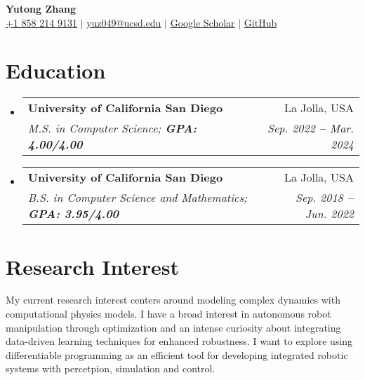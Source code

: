 \documentclass[letterpaper,11pt]{article}
\makeatletter
\newcommand{\resumeEducationHeading}[4]{
    \vspace{-2pt}\item
    \begin{tabular*}{0.97\textwidth}[t]{l@{\extracolsep{\fill}}r}
        \textbf{#1} & #2 \\
        \textit{\small #3} & \textit{\small #4}
    \end{tabular*}\vspace{-7pt}
}
\newcommand{\resumeSubHeadingListStart}{\begin{itemize}[leftmargin=0in, label={}]}
\newcommand{\resumeSubHeadingListEnd}{\end{itemize}}
\makeatother
\begin{document}

\begin{center}
    \textbf{\Huge Yutong Zhang} \\ \vspace{3pt}
    \small
    \faMobile \hspace{.5pt} \href{tel:18582149131}{+1 858 214 9131}
    $|$
    \faEnvelope \hspace{.5pt} \href{mailto:yuz049@ucsd.edu}{yuz049@ucsd.edu}
    $|$
    \faGraduationCap \hspace{.5pt} \href{https://scholar.google.com/citations?user=wuaUYbYAAAAJ&hI}{Google Scholar}
    $|$
    \faGithub \hspace{.5pt} \href{https://github.com/TonyZYT2000}{GitHub}
\end{center}




\section{Education}
    \vspace{3pt}
    \resumeSubHeadingListStart
        \resumeEducationHeading
            {University of California San Diego}
            {La Jolla, USA}
            {M.S. in Computer Science; \textbf{GPA: 4.00/4.00}}
            {Sep. 2022 \textbf{--} Mar. 2024}
        \resumeEducationHeading
            {University of California San Diego}
            {La Jolla, USA}
            {B.S. in Computer Science and Mathematics; \textbf{GPA: 3.95/4.00}}
            {Sep. 2018 \textbf{--} Jun. 2022}
    \resumeSubHeadingListEnd



\section{Research Interest}
    \vspace{3pt}
    My current research interest centers around modeling complex dynamics with computational physics models.
    I have a broad interest in autonomous robot manipulation through optimization and an intense curiosity about integrating data-driven learning techniques for enhanced robustness.
    I want to explore using differentiable programming as an efficient tool for developing integrated robotic systems with percetpion, simulation and control.
\end{document}
